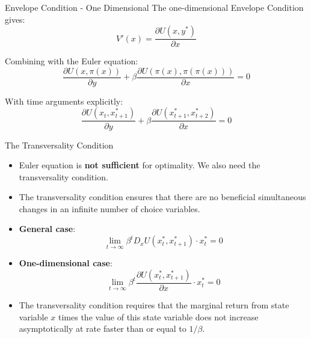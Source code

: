 \documentclass[9pt,aspectratio=169]{beamer}
\begin{document}
\begin{frame}{Envelope Condition - One Dimensional}
The one-dimensional Envelope Condition gives:
\begin{equation*}
V'(x) = \frac{\partial U(x, y^*)}{\partial x}
\end{equation*}

Combining with the Euler equation:
\begin{equation*}
\frac{\partial U(x, \pi(x))}{\partial y} + \beta \frac{\partial U(\pi(x), \pi(\pi(x)))}{\partial x} = 0
\end{equation*}

With time arguments explicitly:
\begin{equation*}
    \frac{\partial U(x_t, x^*_{t+1})}{\partial y} + \beta \frac{\partial
      U(x^*_{t+1}, x^*_{t+2})}{\partial x} = 0
\end{equation*}
\end{frame}

\begin{frame}{The Transversality Condition}
    \begin{itemize}
        \item Euler equation is \textbf{not sufficient} for optimality. We
        also need the transversality condition.
        \item The transversality condition ensures that there are no
        beneficial simultaneous changes in an infinite number of choice
        variables.
        \item \textbf{General case}:
        \begin{equation*}
            \lim_{t \to \infty} \beta^t D_x U(x^*_t, x^*_{t+1}) \cdot x^*_t = 0
        \end{equation*}
        \item \textbf{One-dimensional case}:
        \begin{equation*}
            \lim_{t \to \infty} \beta^t \frac{\partial U(x^*_t,
              x^*_{t+1})}{\partial x} \cdot x^*_t = 0 
        \end{equation*}
        \item The transversality condition requires that the marginal return
        from state variable $x$ times the value of this state variable does
        not increase asymptotically at rate faster than or equal to
        $1/\beta$.
    \end{itemize}
\end{frame}
\end{document}
